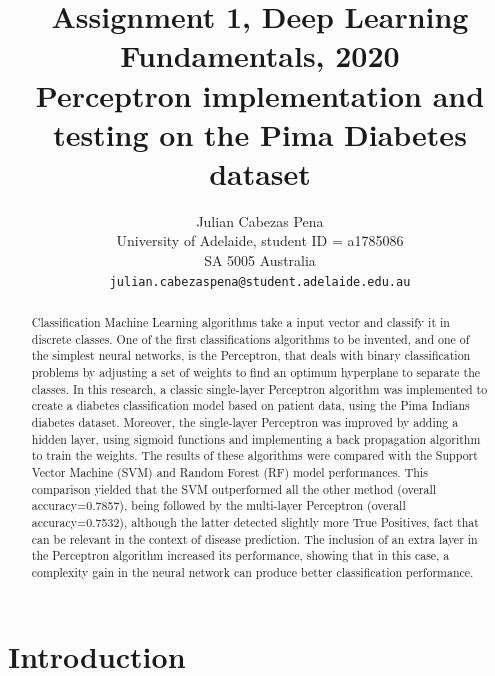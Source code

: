 \documentclass[10pt,twocolumn,letterpaper]{article}
\begin{document}
\title{Assignment 1, Deep Learning Fundamentals, 2020 \\ Perceptron implementation and testing on the Pima Diabetes dataset}

\author{Julian Cabezas Pena\\
University of Adelaide, student ID = a1785086\\
SA 5005 Australia\\
{\tt\small julian.cabezaspena@student.adelaide.edu.au}
}

\maketitle

\begin{abstract}
Classification Machine Learning algorithms take a input vector and classify it in discrete classes. One of the first classifications algorithms to be invented, and one of the simplest neural networks, is the Perceptron, that deals with binary classification problems by adjusting a set of weights to find an optimum hyperplane to separate the classes. In this research, a classic single-layer Perceptron algorithm was implemented to create a diabetes classification model based on patient data, using the Pima Indians diabetes dataset. Moreover, the single-layer Perceptron was improved by adding a hidden layer, using sigmoid functions and implementing a back propagation algorithm to train the weights. The results of these algorithms were compared with the Support Vector Machine (SVM) and Random Forest (RF) model performances. This comparison yielded that the SVM outperformed all the other method (overall accuracy=0.7857), being followed by the multi-layer Perceptron (overall accuracy=0.7532), although the latter detected slightly more True Positives, fact that can be relevant in the context of disease prediction. The inclusion of an extra layer in the Perceptron algorithm increased its performance, showing that in this case, a complexity gain in the neural network can produce better classification performance.
\end{abstract}

\section{Introduction}
\end{document}
